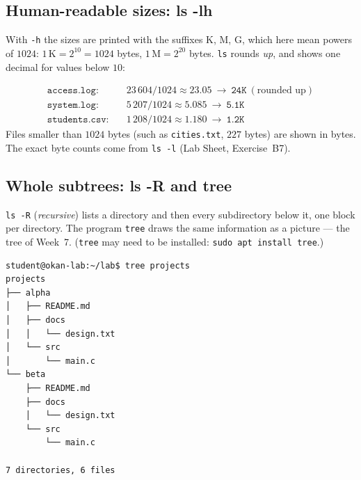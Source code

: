 \documentclass[11pt,a4paper]{article}
\newcommand{\cmd}[1]{\texttt{#1}}
\begin{document}
\subsection{Human-readable sizes: ls -lh}


With \cmd{-h} the sizes are printed with the suffixes K, M, G, which here mean powers of $1024$: $1\,\text{K} = 2^{10} = 1024$ bytes, $1\,\text{M} = 2^{20}$ bytes. \cmd{ls} rounds \emph{up}, and shows one decimal for values below $10$:

\begin{example}
\begin{align*}
\texttt{access.log}:&\quad 23\,604 / 1024 \approx 23.05 \ \longrightarrow\ \texttt{24K}\ (\text{rounded up})\\
\texttt{system.log}:&\quad 5\,207 / 1024 \approx 5.085 \ \longrightarrow\ \texttt{5.1K}\\
\texttt{students.csv}:&\quad 1\,208 / 1024 \approx 1.180 \ \longrightarrow\ \texttt{1.2K}
\end{align*}
Files smaller than $1024$ bytes (such as \texttt{cities.txt}, $227$ bytes) are shown in bytes. The exact byte counts come from \cmd{ls -l} (Lab Sheet, Exercise~B7).
\end{example}

\subsection{Whole subtrees: ls -R and tree}

\cmd{ls -R} (\emph{recursive}) lists a directory and then every subdirectory below it, one block per directory. The program \cmd{tree} draws the same information as a picture --- the tree of Week~7. (\cmd{tree} may need to be installed: \cmd{sudo apt install tree}.)


\begin{tcolorbox}[enhanced,colback=dark,colframe=dark,arc=0pt,boxrule=0pt,left=6pt,right=6pt,top=4pt,bottom=4pt,coltext=light,fontupper=\footnotesize]
\begin{verbatim}
student@okan-lab:~/lab$ tree projects
projects
├── alpha
│   ├── README.md
│   ├── docs
│   │   └── design.txt
│   └── src
│       └── main.c
└── beta
    ├── README.md
    ├── docs
    │   └── design.txt
    └── src
        └── main.c

7 directories, 6 files
\end{verbatim}
\end{tcolorbox}
\end{document}
